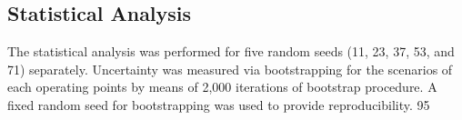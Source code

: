 \subsection{Statistical Analysis}
\label{subsec:statistical_analysis}
The statistical analysis was performed for five random seeds (11, 23, 37, 53, and 71) separately. Uncertainty was measured via bootstrapping for the scenarios of each operating points by means of 2,000 iterations of bootstrap procedure. A fixed random seed for bootstrapping was used to provide reproducibility. 95%